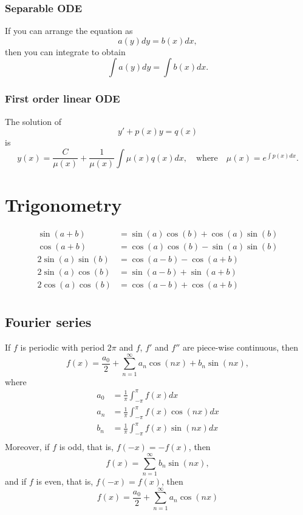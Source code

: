 \documentclass[12pt]{article}
\begin{document}
\subsubsection*{Separable ODE}
If you can arrange the equation as $$a(y)dy=b(x)dx,$$
then you can integrate to obtain $$\int a(y)dy=\int b(x)dx.$$

\subsubsection*{First order linear ODE}
The solution of
$$
y'+p(x)y=q(x)
$$
is
$$
y(x)=\frac{C}{\mu(x)}+\frac{1}{\mu(x)}\int \mu(x)q(x)dx,\quad\textrm{where}\quad
\mu(x)=e^{\int p(x)dx}.
$$

\section*{Trigonometry}

\begin{equation*}
\begin{split}
\sin(a+b)&=\sin(a)\cos(b)+\cos(a)\sin(b)\\
\cos(a+b)&=\cos(a)\cos(b)-\sin(a)\sin(b)\\
2\sin(a)\sin(b) &= \cos(a-b)-\cos(a+b)\\
2\sin(a)\cos(b) &= \sin(a-b)+\sin(a+b)\\
2\cos(a)\cos(b) &= \cos(a-b)+\cos(a+b)\\
\end{split}
\end{equation*}

\newpage
\subsection*{Fourier series}

If $f$ is periodic with period $2\pi$ and $f$, $f'$ and $f''$ are piece-wise continuous, then
$$
f(x)
=\frac{a_0}{2}
+\sum_{n=1}^\infty a_n\cos(nx)+b_n\sin(nx),
$$
where
\begin{equation*}
\begin{split}
a_0&=\frac{1}{\pi}\int_{-\pi}^{\pi}
f(x)dx\\
a_n&=\frac{1}{\pi}\int_{-\pi}^{\pi}
f(x)\cos(nx)dx\\
b_n&=\frac{1}{\pi}\int_{-\pi}^{\pi}
f(x)\sin(nx)dx\\
\end{split}
\end{equation*}
Moreover, if $f$ is odd, that is, $f(-x)=-f(x)$,
then
$$
f(x)
=\sum_{n=1}^\infty b_n\sin(nx),
$$
and if $f$ is even, that is, $f(-x)=f(x)$, then
$$
f(x)
=\frac{a_0}{2}
+\sum_{n=1}^\infty a_n\cos(nx)
$$
\end{document}
